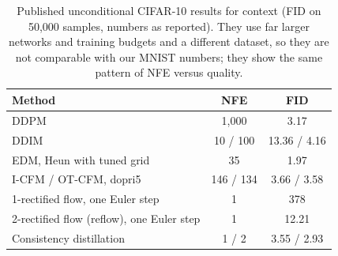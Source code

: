 \begin{table}[t]
\centering
\caption{Published unconditional CIFAR-10 results for context (FID on 50,000 samples, numbers as reported). They use far larger networks and training budgets and a different dataset, so they are not comparable with our MNIST numbers; they show the same pattern of NFE versus quality.}
\label{tab:literature}
\small
\begin{tabular}{lcc}
\toprule
Method & NFE & FID \\
\midrule
DDPM \citep{ho2020ddpm} & 1,000 & 3.17 \\
DDIM \citep{song2021ddim} & 10 / 100 & 13.36 / 4.16 \\
EDM, Heun with tuned grid \citep{karras2022edm} & 35 & 1.97 \\
I-CFM / OT-CFM, dopri5 \citep{tong2024otcfm} & 146 / 134 & 3.66 / 3.58 \\
1-rectified flow, one Euler step \citep{liu2023rf} & 1 & 378 \\
2-rectified flow (reflow), one Euler step \citep{liu2023rf} & 1 & 12.21 \\
Consistency distillation \citep{song2023cm} & 1 / 2 & 3.55 / 2.93 \\
\bottomrule
\end{tabular}
\end{table}
